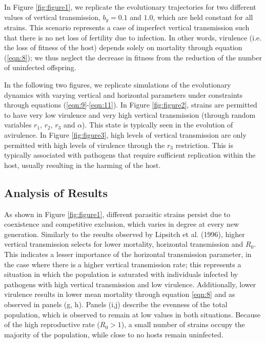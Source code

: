In Figure \ref{fig:figure1}, we replicate the evolutionary trajectories for
two different values of vertical transmission, $b_y = 0.1$ and $1.0$, which
are held constant for all strains. This scenario represents a case of imperfect
vertical transmission such that there is no net loss of fertility due to
infection. In other words, virulence (i.e. the loss of fitness of the host)
depends solely on mortality through equation (\ref{eqn:8}); we thus neglect
the decrease in fitness from the reduction of the number of uninfected offspring.

In the following two figures, we replicate simulations of the evolutionary
dynamics with varying vertical and horizontal parameters under constraints
through equations (\ref{eqn:9}-\ref{eqn:11}). In Figure \ref{fig:figure2},
strains are permitted to have very low virulence and very high vertical
transmission (through random variables $r_1$, $r_2$, $r_3$ and $\alpha$). This
state is typically seen in the evolution of avirulence. In Figure
\ref{fig:figure3}, high levels of vertical transmission are only permitted with
high levels of virulence through the $r_3$ \in [0, $r_1$] restriction. This is
typically associated with pathogens that require sufficient replication within
the host, usually resulting in the harming of the host.

\subsection{Analysis of Results}
As shown in Figure \ref{fig:figure1}, different parasitic strains persist due
to coexistence and competitive exclusion, which varies in degree at every new
generation. Similarly to the results observed by Lipsitch et al.
(1996)\supercite{Lipsitch:1996}, higher vertical transmission selects for lower
mortality, horizontal transmission and $R_0$. This indicates a lesser importance
of the horizontal transmission parameter, in the case where there is a higher
vertical transmission rate; this represents a situation in which the population
is saturated with individuals infected by pathogens with high vertical
transmission and low virulence. Additionally, lower virulence results in lower
mean mortality through equation \ref{eqn:8} and as observed in panels (g, h).
Panels (i,j) describe the evenness of the total population, which is observed
to remain at low values in both situations. Because of the high reproductive
rate ($R_0 > 1$), a small number of strains occupy the majority of the
population, while close to no hosts remain uninfected.

